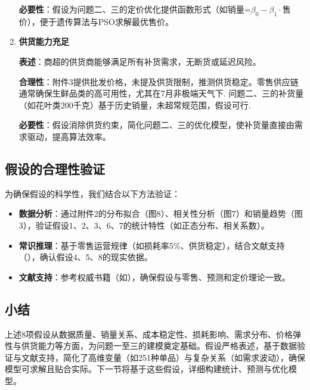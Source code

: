 \documentclass{cumcmthesis} %
\begin{document}
\begin{enumerate}
\textbf{必要性}：假设为问题二、三的定价优化提供函数形式（如销量=$\beta_0-\beta_1\cdot$售价），便于遗传算法与PSO求解最优售价。

\item \textbf{供货能力充足} \


\textbf{表述}：商超的供货商能够满足所有补货需求，无断货或延迟风险。 \


\textbf{合理性}：附件3提供批发价格，未提及供货限制，推测供货稳定。零售供应链通常确保生鲜品类的高可用性，尤其在7月非极端天气下\cite{Chopra2007}. 问题二、三的补货量（如花叶类200千克）基于历史销量，未超常规范围，假设可行\cite{hair2019multivariate}. \


\textbf{必要性}：假设消除供货约束，简化问题二、三的优化模型，使补货量直接由需求驱动，提高算法效率。

\end{enumerate}

\subsection{假设的合理性验证}

为确保假设的科学性，我们结合以下方法验证：

\begin{itemize}
\item \textbf{数据分析}：通过附件2的分布拟合（图8）、相关性分析（图7）和销量趋势（图3），验证假设1、2、3、6、7的统计特性（如正态分布、相关系数）。
\item \textbf{常识推理}：基于零售运营规律（如损耗率5\%、供货稳定），结合文献支持（\cite{3, Chopra2007}），确认假设4、5、8的现实依据。
\item \textbf{文献支持}：参考权威书籍（如\cite{Hyndman2018forecasting, talluri2006theory, kotler2016marketing}），确保假设与零售、预测和定价理论一致。
\end{itemize}

\subsection{小结}

上述8项假设从数据质量、销量关系、成本稳定性、损耗影响、需求分布、价格弹性与供货能力等方面，为问题一至三的建模奠定基础。假设严格表述，基于数据验证与文献支持，简化了高维变量（如251种单品）与复杂关系（如需求波动），确保模型可求解且贴合实际。下一节将基于这些假设，详细构建统计、预测与优化模型。
\end{document}
